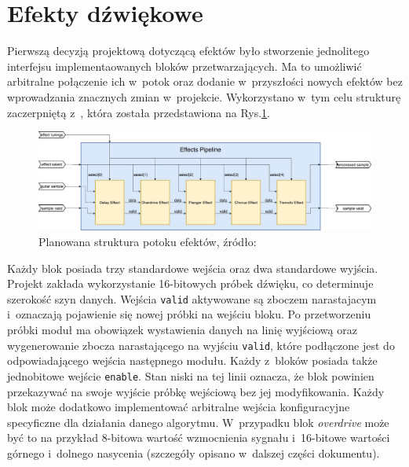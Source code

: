 
\section{Efekty dźwiękowe}

Pierwszą decyzją projektową dotyczącą efektów było stworzenie jednolitego interfejsu implementaowanych bloków przetwarzających. Ma to umożliwić arbitralne połączenie ich w~potok oraz dodanie w~przyszłości nowych efektów bez wprowadzania znacznych zmian w~projekcie. Wykorzystano w~tym celu strukturę zaczerpniętą z~\cite{fpga_pedal}, która została przedstawiona na Rys.\ref{effects-pipe}.

\vspace{0.5cm}
\begin{figure}[ht]
    \centering
    \includegraphics[scale=0.25]{img/pipe.jpg}
    \captionsetup{format=plain,justification=centering}
    \caption{Planowana struktura potoku efektów, źródło: \cite{fpga_pedal}}
    \label{effects-pipe}
\end{figure}
\vspace{0.5cm}

Każdy blok posiada trzy standardowe wejścia oraz dwa standardowe wyjścia. Projekt zakłada wykorzystanie 16-bitowych próbek dźwięku, co determinuje szerokość szyn danych. Wejścia \verb|valid| aktywowane są zboczem narastajacym i~oznaczają pojawienie się nowej próbki na wejściu bloku. Po przetworzeniu próbki moduł ma obowiązek wystawienia danych na linię wyjściową oraz wygenerowanie zbocza narastającego na wyjściu \verb|valid|, które podłączone jest do odpowiadającego wejścia następnego modułu. Każdy z~bloków posiada także jednobitowe wejście \verb|enable|. Stan niski na tej linii oznacza, że blok powinien przekazywać na swoje wyjście próbkę wejściową bez jej modyfikowania. Każdy blok może dodatkowo implementować arbitralne wejścia konfiguracyjne specyficzne dla działania danego algorytmu. W~przypadku blok \textit{overdrive} może być to na przykład 8-bitowa wartość wzmocnienia sygnału i~16-bitowe wartości górnego i~dolnego nasycenia (szczegóły opisano w~dalszej części dokumentu).

